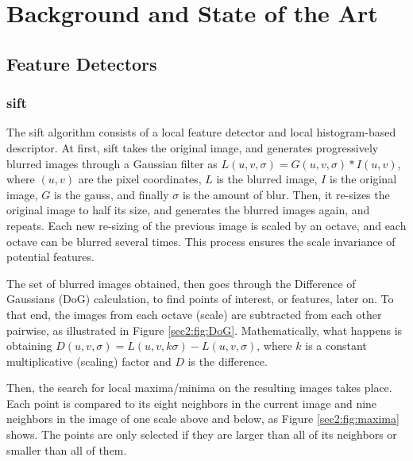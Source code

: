 
\chapter{Background and State of the Art}
\label{appendix:backgroundandsota}

\section{Feature Detectors}
\label{appendix:cha1:feat}
\subsection{\acrlong{sift}}
\label{appendix:cha1:sec1:sift}
The \acrshort{sift} algorithm consists of a local feature detector and local histogram-based descriptor. At first, \acrshort{sift} takes the original image, and generates progressively blurred images through a Gaussian filter as $L (u , v , \sigma ) = G ( u , v, \sigma ) * I ( u , v )$, where $(u, v)$ are the pixel coordinates, $L$ is the blurred image, $I$ is the original image, $G$ is the \gls{gauss}, and finally $\sigma$ is the amount of blur. Then, it re-sizes the original image to half its size, and generates the blurred images again, and repeats. Each new re-sizing of the previous image is scaled by an octave, and each octave can be blurred  several times. This process ensures the scale invariance of potential features.

The set of blurred images obtained, then goes through the Difference of Gaussians (DoG) calculation, to find points of interest, or features, later on. To that end, the images from each octave (scale) are subtracted from each other pairwise, as illustrated in Figure \ref{sec2:fig:DoG}. Mathematically, what happens is obtaining $D ( u , v , \sigma ) = L ( u , v , k \sigma ) - L ( u , v , \sigma )$, where $k$ is a constant multiplicative (scaling) factor and $D$ is the difference.

Then, the search for local maxima/minima on the resulting images takes place. Each point is compared to its eight neighbors in the current image and nine neighbors in the image of one scale above and below, as Figure \ref{sec2:fig:maxima} shows. The points are only selected if they are larger than all of its neighbors or smaller than all of them.

